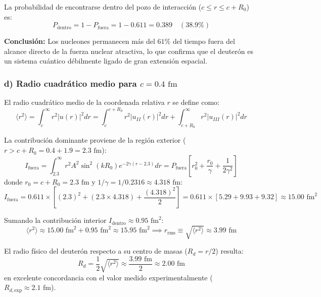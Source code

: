 \begin{problema}
La probabilidad de encontrarse dentro del pozo de interacción ($c \le r \le c + R_0$) es:
\begin{equation}
P_{\text{dentro}} = 1 - P_{\text{fuera}} = 1 - 0.611 = 0.389 \quad (38.9\%)
\end{equation}

\textbf{Conclusión:} Los nucleones permanecen más del $61\%$ del tiempo fuera del alcance directo de la fuerza nuclear atractiva, lo que confirma que el deuterón es un sistema cuántico débilmente ligado de gran extensión espacial.

\subsubsection*{d) Radio cuadrático medio para $c = 0.4\text{ fm}$}

El radio cuadrático medio de la coordenada relativa $r$ se define como:
\begin{equation}
\langle r^2 \rangle = \int_c^\infty r^2 |u(r)|^2 dr = \int_c^{c+R_0} r^2 |u_{II}(r)|^2 dr + \int_{c+R_0}^\infty r^2 |u_{III}(r)|^2 dr
\end{equation}

La contribución dominante proviene de la región exterior ($r > c + R_0 = 0.4 + 1.9 = 2.3\text{ fm}$):
\begin{equation}
I_{\text{fuera}} = \int_{2.3}^\infty r^2 A^2 \sin^2(k R_0) e^{-2\gamma (r - 2.3)} dr = P_{\text{fuera}} \left[ r_0^2 + \frac{r_0}{\gamma} + \frac{1}{2\gamma^2} \right]
\end{equation}
donde $r_0 = c + R_0 = 2.3\text{ fm}$ y $1/\gamma = 1/0.2316 \approx 4.318\text{ fm}$:
\begin{equation}
I_{\text{fuera}} = 0.611 \times \left[ (2.3)^2 + (2.3 \times 4.318) + \frac{(4.318)^2}{2} \right] = 0.611 \times [5.29 + 9.93 + 9.32] \approx 15.00\text{ fm}^2
\end{equation}

Sumando la contribución interior $I_{\text{dentro}} \approx 0.95\text{ fm}^2$:
\begin{equation}
\langle r^2 \rangle \approx 15.00\text{ fm}^2 + 0.95\text{ fm}^2 \approx 15.95\text{ fm}^2 \implies r_{\text{rms}} \equiv \sqrt{\langle r^2 \rangle} \approx 3.99\text{ fm}
\end{equation}

El radio físico del deuterón respecto a su centro de masas ($R_d = r / 2$) resulta:
\begin{equation}
R_d = \frac{1}{2} \sqrt{\langle r^2 \rangle} \approx \frac{3.99\text{ fm}}{2} \approx 2.00\text{ fm}
\end{equation}
en excelente concordancia con el valor medido experimentalmente ($R_{d,\text{exp}} \approx 2.1\text{ fm}$).


\end{problema}
